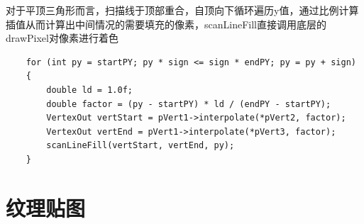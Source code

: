     \begin{spacing}{2.5}
    对于平顶三角形而言，扫描线于顶部重合，自顶向下循环遍历y值，通过比例计算插值从而计算出中间情况的需要填充的像素，scanLineFill直接调用底层的drawPixel对像素进行着色
    
    	
    \end{spacing}

	\begin{lstlisting}
    for (int py = startPY; py * sign <= sign * endPY; py = py + sign)
    {
    	double ld = 1.0f;
       	double factor = (py - startPY) * ld / (endPY - startPY);
       	VertexOut vertStart = pVert1->interpolate(*pVert2, factor);
       	VertexOut vertEnd = pVert1->interpolate(*pVert3, factor);
       	scanLineFill(vertStart, vertEnd, py);
   	}
	\end{lstlisting}


    \section{纹理贴图}

